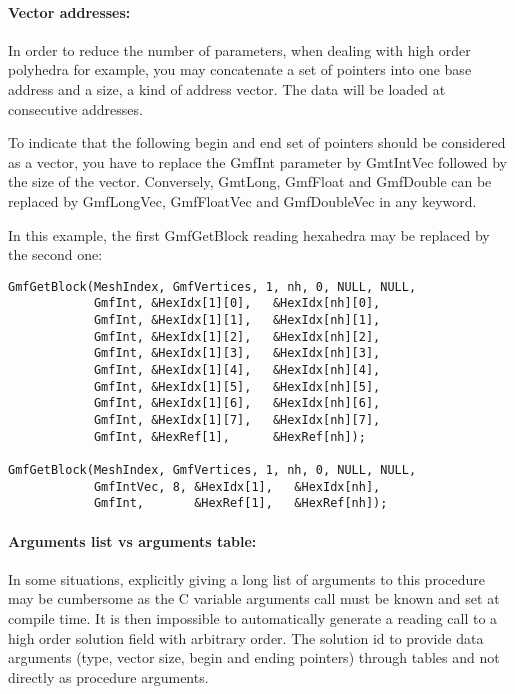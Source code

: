 \documentclass[a4paper,12pt]{article}
\begin{document}
\paragraph{Vector addresses:} In order to reduce the number of parameters, when dealing with high order polyhedra for example, you may concatenate a set of pointers into one base address and a size, a kind of address vector. The data will be loaded at consecutive addresses.

To indicate that the following begin and end set of pointers should be considered as a vector, you have to replace the GmfInt parameter by GmtIntVec followed by the size of the vector. Conversely, GmtLong, GmfFloat and GmfDouble can be replaced by GmfLongVec, GmfFloatVec and GmfDoubleVec in any keyword.

In this example, the first GmfGetBlock reading hexahedra may be replaced by the second one:

\begin{tt}
\begin{verbatim}
GmfGetBlock(MeshIndex, GmfVertices, 1, nh, 0, NULL, NULL,
            GmfInt, &HexIdx[1][0],   &HexIdx[nh][0],
            GmfInt, &HexIdx[1][1],   &HexIdx[nh][1],
            GmfInt, &HexIdx[1][2],   &HexIdx[nh][2],
            GmfInt, &HexIdx[1][3],   &HexIdx[nh][3],
            GmfInt, &HexIdx[1][4],   &HexIdx[nh][4],
            GmfInt, &HexIdx[1][5],   &HexIdx[nh][5],
            GmfInt, &HexIdx[1][6],   &HexIdx[nh][6],
            GmfInt, &HexIdx[1][7],   &HexIdx[nh][7],
            GmfInt, &HexRef[1],      &HexRef[nh]);

GmfGetBlock(MeshIndex, GmfVertices, 1, nh, 0, NULL, NULL,
            GmfIntVec, 8, &HexIdx[1],   &HexIdx[nh],
            GmfInt,       &HexRef[1],   &HexRef[nh]);

\end{verbatim}
\end{tt}
\normalfont

\paragraph{Arguments list vs arguments table:} In some situations, explicitly giving a long list of arguments to this procedure may be cumbersome as the C variable arguments call must be known and set at compile time. It is then impossible to automatically generate a reading call to a high order solution field with arbitrary order.
The solution id to provide data arguments (type, vector size, begin and ending pointers) through tables and not directly as procedure arguments.
\end{document}
